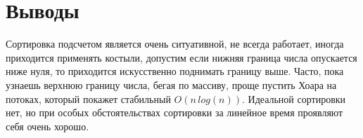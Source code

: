 \section{Выводы}

Сортировка подсчетом является очень ситуативной, не всегда работает, иногда приходится применять костыли, допустим если нижняя граница числа опускается ниже нуля, то приходится искусственно поднимать границу выше. Часто, пока узнаешь верхнюю границу числа, бегая по массиву, проще пустить Хоара на потоках, который покажет стабильный $O(n\,log(n))$. Идеальной сортировки нет, но при особых обстоятельствах сортировки за линейное время проявляют себя очень хорошо.

\pagebreak